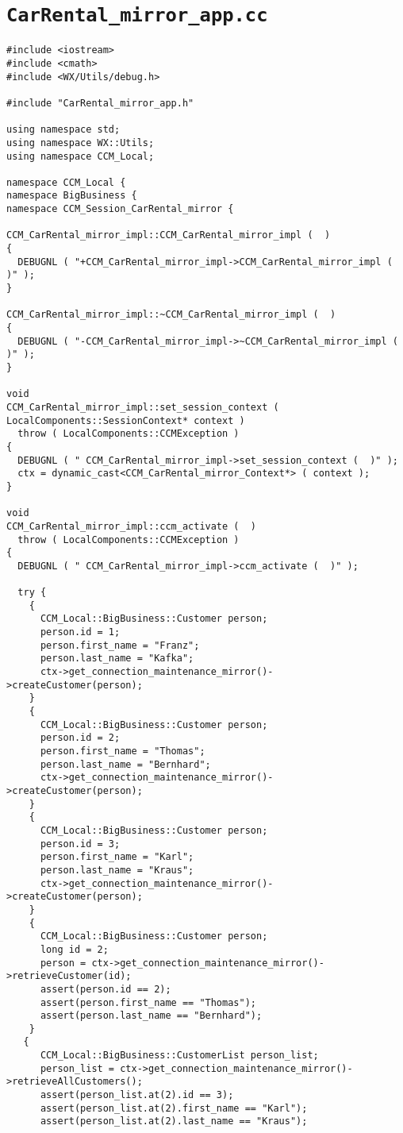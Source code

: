 \section{{\tt CarRental\_mirror\_app.cc}}
\begin{scriptsize}
\begin{verbatim}
#include <iostream>
#include <cmath>
#include <WX/Utils/debug.h>

#include "CarRental_mirror_app.h"

using namespace std;
using namespace WX::Utils;
using namespace CCM_Local;

namespace CCM_Local {
namespace BigBusiness {
namespace CCM_Session_CarRental_mirror {

CCM_CarRental_mirror_impl::CCM_CarRental_mirror_impl (  )
{
  DEBUGNL ( "+CCM_CarRental_mirror_impl->CCM_CarRental_mirror_impl (  )" );
}

CCM_CarRental_mirror_impl::~CCM_CarRental_mirror_impl (  )
{
  DEBUGNL ( "-CCM_CarRental_mirror_impl->~CCM_CarRental_mirror_impl (  )" );
}

void
CCM_CarRental_mirror_impl::set_session_context ( LocalComponents::SessionContext* context )
  throw ( LocalComponents::CCMException )
{
  DEBUGNL ( " CCM_CarRental_mirror_impl->set_session_context (  )" );
  ctx = dynamic_cast<CCM_CarRental_mirror_Context*> ( context );
}

void
CCM_CarRental_mirror_impl::ccm_activate (  )
  throw ( LocalComponents::CCMException )
{
  DEBUGNL ( " CCM_CarRental_mirror_impl->ccm_activate (  )" );

  try {
    {
      CCM_Local::BigBusiness::Customer person;
      person.id = 1;
      person.first_name = "Franz";
      person.last_name = "Kafka";
      ctx->get_connection_maintenance_mirror()->createCustomer(person);
    }
    {
      CCM_Local::BigBusiness::Customer person;
      person.id = 2;
      person.first_name = "Thomas";
      person.last_name = "Bernhard";
      ctx->get_connection_maintenance_mirror()->createCustomer(person);
    }
    {
      CCM_Local::BigBusiness::Customer person;
      person.id = 3;
      person.first_name = "Karl";
      person.last_name = "Kraus";
      ctx->get_connection_maintenance_mirror()->createCustomer(person);
    }
    {
      CCM_Local::BigBusiness::Customer person;
      long id = 2;
      person = ctx->get_connection_maintenance_mirror()->retrieveCustomer(id);
      assert(person.id == 2);
      assert(person.first_name == "Thomas");
      assert(person.last_name == "Bernhard");
    }
   {
      CCM_Local::BigBusiness::CustomerList person_list;
      person_list = ctx->get_connection_maintenance_mirror()->retrieveAllCustomers();
      assert(person_list.at(2).id == 3);
      assert(person_list.at(2).first_name == "Karl");
      assert(person_list.at(2).last_name == "Kraus");


\end{verbatim}
\end{scriptsize}
